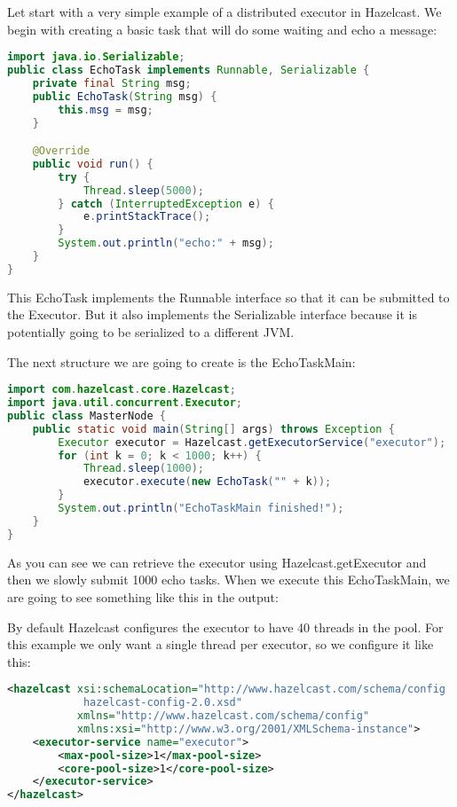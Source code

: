 Let start with a very simple example of a distributed executor in Hazelcast. We begin with creating a basic task that will do some waiting and echo a message:

\begin{lstlisting}[language=java]
import java.io.Serializable;
public class EchoTask implements Runnable, Serializable {
    private final String msg;
    public EchoTask(String msg) {
        this.msg = msg;
    }

    @Override
    public void run() {
        try {
            Thread.sleep(5000);
        } catch (InterruptedException e) {
            e.printStackTrace();
        }
        System.out.println("echo:" + msg);
    }
}
\end{lstlisting}

This EchoTask implements the Runnable interface so that it can be submitted to the Executor. But it also implements the Serializable interface because it is potentially going to be serialized to a different JVM. 

The next structure we are going to create is the EchoTaskMain:
\begin{lstlisting}[language=java]
import com.hazelcast.core.Hazelcast;
import java.util.concurrent.Executor;
public class MasterNode {
    public static void main(String[] args) throws Exception {
        Executor executor = Hazelcast.getExecutorService("executor");
        for (int k = 0; k < 1000; k++) {
            Thread.sleep(1000);
            executor.execute(new EchoTask("" + k));
        }
        System.out.println("EchoTaskMain finished!");
    }
}
\end{lstlisting}
As you can see we can retrieve the executor using Hazelcast.getExecutor and then we slowly submit 1000 echo tasks. When we execute this EchoTaskMain, we are going to see something like this in the output:

By default Hazelcast configures the executor to have 40 threads in the pool. For this example we only want a single thread per executor, so we configure it like this:

\begin{lstlisting}[language=xml]
<hazelcast xsi:schemaLocation="http://www.hazelcast.com/schema/config
            hazelcast-config-2.0.xsd"
           xmlns="http://www.hazelcast.com/schema/config"
           xmlns:xsi="http://www.w3.org/2001/XMLSchema-instance">
    <executor-service name="executor">
        <max-pool-size>1</max-pool-size>
        <core-pool-size>1</core-pool-size>
    </executor-service>
</hazelcast>
\end{lstlisting}

